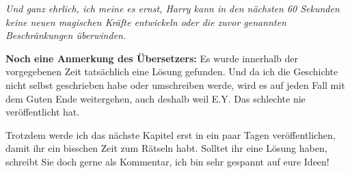 \emph{Und ganz ehrlich, ich meine es ernst, Harry kann in den nächsten 60
Sekunden keine neuen magischen Kräfte entwickeln oder die zuvor genannten
Beschränkungen überwinden.}

\textbf{Noch eine Anmerkung des Übersetzers:}
Es wurde innerhalb der vorgegebenen Zeit tatsächlich eine Lösung gefunden. Und
da ich die Geschichte nicht selbst geschrieben habe oder umschreiben werde, wird
es auf jeden Fall mit dem \glqq{}Guten Ende\grqq{} weitergehen, auch deshalb
weil E.Y. Das schlechte nie veröffentlicht hat.

Trotzdem werde ich das nächste Kapitel erst in ein paar Tagen veröffentlichen,
damit ihr ein bisschen Zeit zum Rätseln habt. Solltet ihr eine Lösung haben,
schreibt Sie doch gerne als Kommentar, ich bin sehr gespannt auf eure Ideen!

